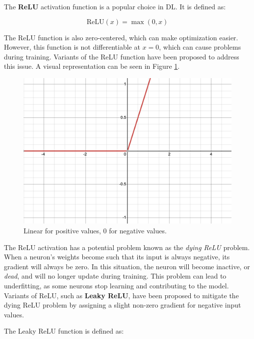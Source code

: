 \label{sec:relu}

The \textbf{\acf{ReLU}} activation function is a popular choice in \ac{DL}. It is defined as:

\begin{equation}
	\text{ReLU}(x) = \max(0, x)
\end{equation}

The \ac{ReLU} function is also zero-centered, which can make optimization easier. However, this function is not differentiable at $x=0$, which can cause problems during training. Variants of the \ac{ReLU} function have been proposed to address this issue. A visual representation can be seen in Figure \ref{fig:relu}.

\begin{figure}[ht]
    \centering
    \includegraphics[width=\textwidth/2]{figures/2-sota/activation/relu.png}
    \caption[Relu Activation Function]{Linear for positive values, 0 for negative values.}
    \label{fig:relu}
\end{figure}

The \ac{ReLU} activation has a potential problem known as the \textit{dying ReLU} problem. When a neuron's weights become such that its input is always negative, its gradient will always be zero. In this situation, the neuron will become inactive, or \textit{dead}, and will no longer update during training. This problem can lead to underfitting, as some neurons stop learning and contributing to the model. Variants of \ac{ReLU}, such as \textbf{Leaky \ac{ReLU}}, have been proposed to mitigate the dying \ac{ReLU} problem by assigning a slight non-zero gradient for negative input values.

The Leaky ReLU function is defined as:

